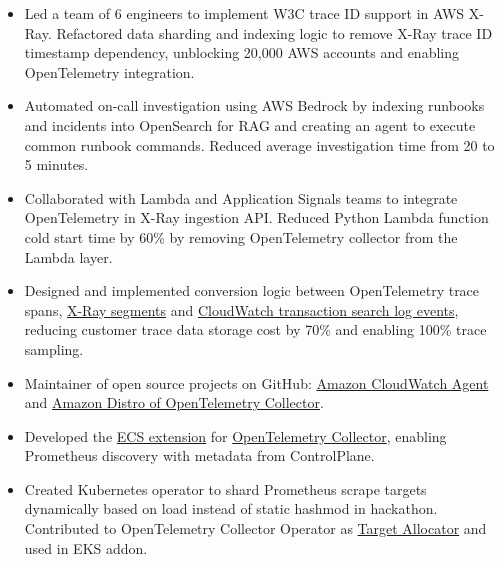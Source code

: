 \documentclass[11pt, letterpaper]{simple-cv}
\begin{document}
\begin{itemize}
	\item Led a team of 6 engineers to implement W3C trace ID support in AWS X-Ray.
	Refactored data sharding and indexing logic to remove X-Ray trace ID timestamp dependency, unblocking 20,000 AWS accounts and enabling OpenTelemetry integration.
	\item Automated on-call investigation using AWS Bedrock by indexing runbooks and incidents into OpenSearch for RAG and creating an agent to execute common runbook commands. Reduced average investigation time from 20 to 5 minutes.
	\item Collaborated with Lambda and Application Signals teams to integrate OpenTelemetry in X-Ray ingestion API. Reduced Python Lambda function cold start time by 60\% by removing OpenTelemetry collector from the Lambda layer.
	\item Designed and implemented conversion logic between OpenTelemetry trace spans, 
	\href{https://docs.aws.amazon.com/xray/latest/devguide/xray-api-segmentdocuments.html}{X-Ray segments} and 
	\href{https://docs.aws.amazon.com/AmazonCloudWatch/latest/monitoring/CloudWatch-Transaction-Search.html}{CloudWatch transaction search log events},
	reducing customer trace data storage cost by 70\% and enabling 100\% trace sampling.
	\item Maintainer of open source projects on GitHub: \href{https://github.com/aws/amazon-cloudwatch-agent}{Amazon CloudWatch Agent} and \href{https://github.com/aws-observability/aws-otel-collector}{Amazon Distro of OpenTelemetry Collector}.
	\item Developed the \href{https://github.com/open-telemetry/opentelemetry-collector-contrib/tree/main/extension/observer/ecsobserver}{ECS extension} for \href{https://github.com/open-telemetry/opentelemetry-collector-contrib}{OpenTelemetry Collector},
	enabling Prometheus discovery with metadata from ControlPlane.
	\item Created Kubernetes operator to shard Prometheus scrape targets dynamically based on load instead of static hashmod in hackathon.
	Contributed to OpenTelemetry Collector Operator as \href{https://github.com/open-telemetry/opentelemetry-operator/tree/main/cmd/otel-allocator}{Target Allocator} and used in EKS addon.
\end{itemize}
\end{document}
